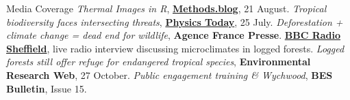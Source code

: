 \begin{rubric}{Media Coverage}
\entry*[2019] \emph{Thermal Images in R}, \textbf{\href{https://methodsblog.com/2019/08/21/thermal-images-r/}{Methods.blog}}, 21 August. 
\entry*[2019] \emph{Tropical biodiversity faces intersecting threats}, \textbf{\href{https://physicstoday.scitation.org/do/10.1063/PT.6.1.20190725a/full/}{Physics Today}}, 25 July. 
\entry*[2019] \emph{Deforestation + climate change = dead end for wildlife}, \textbf{Agence France Presse}. 
\entry*[2017] \textbf{\href{https://acce.shef.ac.uk/good-news-for-a-change-acce-student-rebecca-seniors-interview-for-bbc/}{BBC Radio Sheffield}}, live radio interview discussing microclimates in logged forests. 
\entry*[2017] \emph{Logged forests still offer refuge for endangered tropical species}, \textbf{Environmental Research Web}, 27 October.
\entry*[2016] \emph{Public engagement training \& Wychwood}, \textbf{BES Bulletin}, Issue 15.
\end{rubric}